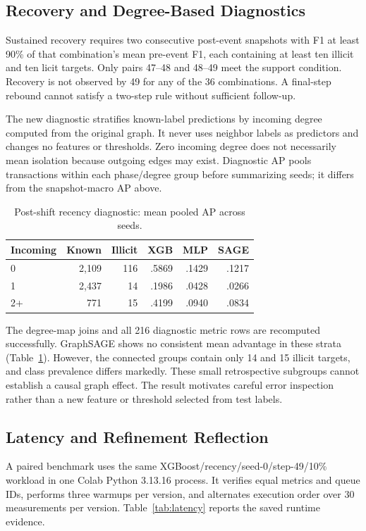 \documentclass[conference]{IEEEtran}
\begin{document}
\subsection{Recovery and Degree-Based Diagnostics}
Sustained recovery requires two consecutive post-event snapshots with F1 at least 90\% of that combination's mean pre-event F1, each containing at least ten illicit and ten licit targets. Only pairs 47--48 and 48--49 meet the support condition. Recovery is not observed by 49 for any of the 36 combinations. A final-step rebound cannot satisfy a two-step rule without sufficient follow-up.

The new diagnostic stratifies known-label predictions by incoming degree computed from the original graph. It never uses neighbor labels as predictors and changes no features or thresholds. Zero incoming degree does not necessarily mean isolation because outgoing edges may exist. Diagnostic AP pools transactions within each phase/degree group before summarizing seeds; it differs from the snapshot-macro AP above.

\begin{table}[t]\caption{Post-shift recency diagnostic: mean pooled AP across seeds.}\centering\footnotesize\setlength{\tabcolsep}{3pt}
\begin{tabular}{lrrrrr}\toprule
Incoming & Known & Illicit & XGB & MLP & SAGE\\\midrule
0 & 2,109 & 116 & .5869 & .1429 & .1217\\
1 & 2,437 & 14 & .1986 & .0428 & .0266\\
2+ & 771 & 15 & .4199 & .0940 & .0834\\\bottomrule
\end{tabular}\label{tab:degree}\end{table}

The degree-map joins and all 216 diagnostic metric rows are recomputed successfully. GraphSAGE shows no consistent mean advantage in these strata (Table~\ref{tab:degree}). However, the connected groups contain only 14 and 15 illicit targets, and class prevalence differs markedly. These small retrospective subgroups cannot establish a causal graph effect. The result motivates careful error inspection rather than a new feature or threshold selected from test labels.

\subsection{Latency and Refinement Reflection}
A paired benchmark uses the same XGBoost/recency/seed-0/step-49/10\% workload in one Colab Python 3.13.16 process. It verifies equal metrics and queue IDs, performs three warmups per version, and alternates execution order over 30 measurements per version. Table~\ref{tab:latency} reports the saved runtime evidence.
\end{document}

